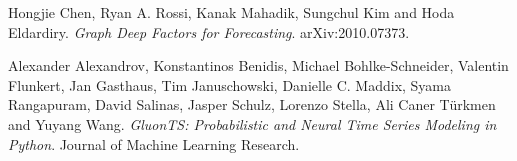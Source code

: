 \documentclass[en]{pracamgr}
\begin{document}
\begin{thebibliography}{99}
 Hongjie Chen, Ryan A. Rossi, Kanak Mahadik, Sungchul Kim and Hoda Eldardiry. \textit{Graph Deep Factors for Forecasting}. arXiv:2010.07373.

 Alexander Alexandrov, Konstantinos Benidis, Michael Bohlke-Schneider, Valentin Flunkert, Jan Gasthaus, Tim Januschowski, Danielle C. Maddix, Syama Rangapuram, David Salinas, Jasper Schulz, Lorenzo Stella,
Ali Caner Türkmen and Yuyang Wang. \textit{GluonTS: Probabilistic and Neural Time Series Modeling in Python}. Journal of Machine Learning Research.

\end{thebibliography}
\end{document}
